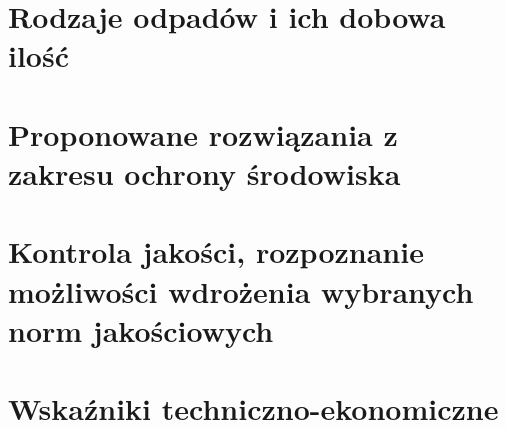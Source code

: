 \documentclass{article}
\begin{document}
\section{Rodzaje odpadów i ich dobowa ilość}

\section{Proponowane rozwiązania z zakresu ochrony środowiska}

\section{Kontrola jakości, rozpoznanie możliwości wdrożenia wybranych norm jakościowych}

\section{Wskaźniki techniczno-ekonomiczne}

\newpage
\renewcommand*{\bibfont}{\small}
\printbibliography
\end{document}
